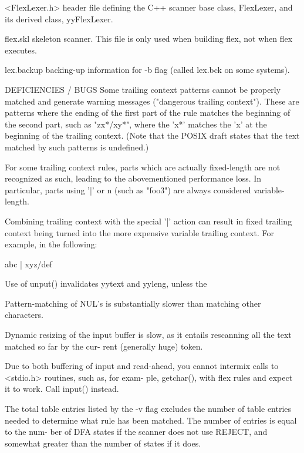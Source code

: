\documentclass[12pt,spanish,twocolumn,lettersize]{article}
\begin{document}
{       <FlexLexer.h>
	      header file defining the C++  scanner  base  class,
	      FlexLexer, and its derived class, yyFlexLexer.

       flex.skl
	      skeleton	scanner.   This	 file  is  only used when
	      building flex, not when flex executes.

       lex.backup
	      backing-up information for -b flag (called  lex.bck
	      on some systems).

DEFICIENCIES / BUGS
       Some  trailing context patterns cannot be properly matched
       and  generate  warning	messages   ("dangerous	 trailing
       context").   These  are	patterns  where the ending of the
       first part of the rule matches the beginning of the second
       part, such as "zx*/xy*", where the 'x*' matches the 'x' at
       the beginning of the trailing  context.	 (Note	that  the
       POSIX  draft states that the text matched by such patterns
       is undefined.)

       For some trailing context rules, parts which are	 actually
       fixed-length  are  not  recognized as such, leading to the
       abovementioned performance  loss.   In  particular,  parts
       using  '|' or {n} (such as "foo{3}") are always considered
       variable-length.

       Combining trailing context with the special '|' action can
       result  in  fixed  trailing  context being turned into the
       more expensive variable trailing context.  For example, in
       the following:

	   abc	    |
	   xyz/def

       Use  of	unput() invalidates yytext and yyleng, unless the

       Pattern-matching of NUL's  is  substantially  slower  than
       matching other characters.

       Dynamic	resizing  of  the  input  buffer  is  slow, as it
       entails rescanning all the text matched so far by the cur-
       rent (generally huge) token.

       Due  to both buffering of input and read-ahead, you cannot
       intermix calls to <stdio.h> routines, such as,  for  exam-
       ple,  getchar(),	 with  flex  rules and expect it to work.
       Call input() instead.

       The total table entries listed by the -v flag excludes the
       number  of table entries needed to determine what rule has
       been matched.  The number of entries is equal to the  num-
       ber  of DFA states if the scanner does not use REJECT, and
       somewhat greater than the number of states if it does.

}
\end{document}
